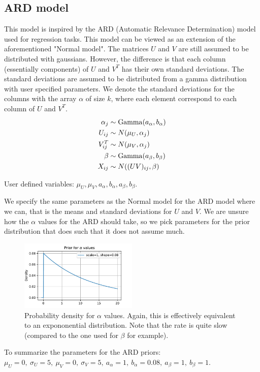 \documentclass[12pt]{article}
\begin{document}
    \subsection{ARD model}
    This model is inspired by the ARD (Automatic Relevance Determination) model used for regression tasks. This model can be viewed as an extension of the aforementioned "Normal model". The matrices $U$ and $V$ are still assumed to be distributed with gaussians. However, the difference is that each column (essentially components) of $U$ and $V^T$ has their own standard deviations. The standard deviations are assumed to be distributed from a gamma distribution with user specified parameters. We denote the standard deviations for the columns with the array $\alpha$ of size $k$, where each element correspond to each column of $U$ and $V^T$.
    \begin{align*}
        \alpha_{j}  &\sim \operatorname{Gamma}(a_\alpha, b_\alpha) \\
        U_{ij}  &\sim N(\mu_U, \alpha_j) \\
        V^T_{ij}  &\sim N(\mu_V, \alpha_j) \\
        \beta  &\sim \operatorname{Gamma}(a_\beta, b_\beta) \\
        X_{ij} &\sim N((UV)_{ij}, \beta)
    \end{align*}

    User defined variables: $\mu_U, \mu_V, a_\alpha, b_\alpha, a_\beta, b_\beta$.
    
    \vspace{3mm}
    We specify the same parameters as the Normal model for the ARD model where we can, that is the means and standard deviations for $U$ and $V$. We are unsure how the $\alpha$ values for the ARD should take, so we pick parameters for the prior distribution that does such that it does not assume much. 
    \begin{figure}[H]
        \centering
        \includegraphics[width=0.5\textwidth]{alphaprior.pdf}
        \caption{Probability density for $\alpha$ values. Again, this is effectively equivalent to an expononential distribution. Note that the rate is quite slow (compared to the one used for $\beta$ for example).}
    \end{figure}
    To summarize the parameters for the ARD priors: $\mu_U=0,\ \sigma_U=5,\ \mu_V=0,\ \sigma_V=5,\ a_\alpha=1,\ b_\alpha=0.08, \ a_\beta=1,\ b_\beta=1$.
\end{document}
